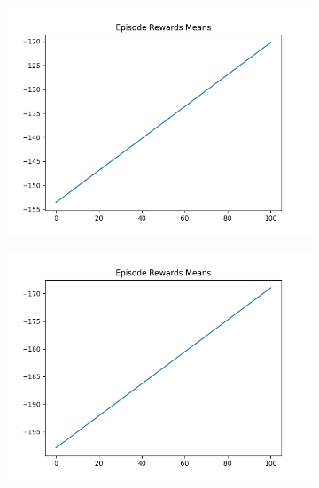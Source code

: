 \begin{figure}[H]
    \centering
    \begin{subfigure}{.47\linewidth}
        \centering
        \includegraphics[width=\textwidth]{mountain/2024-06-15_13-36-42_dqn_mountaincar_episode_rewards_means.png}
    \end{subfigure}
    \begin{subfigure}{.47\linewidth}
        \centering
        \includegraphics[width=\textwidth]{mountain/2024-06-15_13-45-28_dqn_mountaincar_episode_rewards_means.png}
    \end{subfigure}
    \begin{subfigure}{.47\linewidth}
        \centering

\end{subfigure}
\end{figure}
